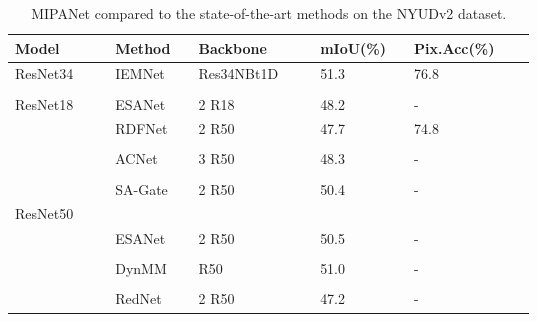 \documentclass{aims}
\numberwithin{equation}{section}
\begin{document}
\begin{table}[!htb]
  \centering
  \caption{MIPANet compared to the state-of-the-art methods on the NYUDv2 dataset.}
    \begin{tabular}{lllllllllllll}
    \toprule
    \toprule
    Model &       &       & Method &       &        Backbone &       &       & mIoU(\%)  &       &        Pix.Acc(\%) \\
    \midrule
    ResNet34 &       &       & IEMNet\cite{xu2023interactive}  &       &        Res34NBt1D &       &       & 51.3  &       &       76.8 \\
    \midrule
    &       &       &       &       &       &       &       &       &       &       &         \\
    ResNet18 &       &       & ESANet\cite{seichter2021efficient} &       &        2  R18 &       &       & 48.2  &       &        - \\
    \midrule
          &       &       & RDFNet\cite{park2017rdfnet} &       &        2   R50 &       &       & 47.7  &       &       74.8 \\
          &       &       &       &       &       &       &       &       &       &       &         \\
          &       &       & ACNet\cite{hu2019acnet} &       &        3   R50 &       &       & 48.3  &       &        - \\
          &       &       &       &       &       &       &       &       &       &       &         \\
          &       &       & SA-Gate\cite{chen2020bi} &       &        2   R50 &       &       & 50.4  &       &        - \\
    ResNet50 &       &       &       &       &       &       &       &       &       &       &         \\
          &       &       & ESANet &       &        2   R50 &       &       & 50.5  &       &        - \\
          &       &       &       &       &       &       &       &       &       &       &         \\
          &       &       & DynMM\cite{xue2023dynamic} &       &        R50   &       &       & 51.0    &       &       - \\
          &       &       &       &       &       &       &       &       &       &       &         \\
          &       &       & RedNet\cite{jiang2018rednet} &       &        2   R50 &       &       & 47.2  &       &        - \\

\end{tabular}
\end{table}
\end{document}
